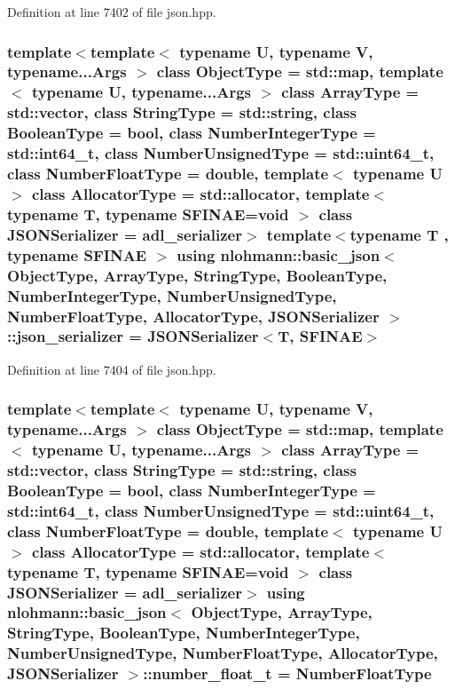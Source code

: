 Definition at line 7402 of file json.\+hpp.

\subsubsection[{\texorpdfstring{json\+\_\+serializer}{json_serializer}}]{\setlength{\rightskip}{0pt plus 5cm}template$<$template$<$ typename U, typename V, typename...\+Args $>$ class Object\+Type = std\+::map, template$<$ typename U, typename...\+Args $>$ class Array\+Type = std\+::vector, class String\+Type  = std\+::string, class Boolean\+Type  = bool, class Number\+Integer\+Type  = std\+::int64\+\_\+t, class Number\+Unsigned\+Type  = std\+::uint64\+\_\+t, class Number\+Float\+Type  = double, template$<$ typename U $>$ class Allocator\+Type = std\+::allocator, template$<$ typename T, typename S\+F\+I\+N\+A\+E=void $>$ class J\+S\+O\+N\+Serializer = adl\+\_\+serializer$>$ template$<$typename T , typename S\+F\+I\+N\+AE $>$ using {\bf nlohmann\+::basic\+\_\+json}$<$ Object\+Type, Array\+Type, String\+Type, Boolean\+Type, Number\+Integer\+Type, Number\+Unsigned\+Type, Number\+Float\+Type, Allocator\+Type, J\+S\+O\+N\+Serializer $>$\+::{\bf json\+\_\+serializer} =  J\+S\+O\+N\+Serializer$<$T, S\+F\+I\+N\+AE$>$}\hypertarget{classnlohmann_1_1basic__json_a7768841baaaa7a21098a401c932efaff}{}\label{classnlohmann_1_1basic__json_a7768841baaaa7a21098a401c932efaff}


Definition at line 7404 of file json.\+hpp.

\subsubsection[{\texorpdfstring{number\+\_\+float\+\_\+t}{number_float_t}}]{\setlength{\rightskip}{0pt plus 5cm}template$<$template$<$ typename U, typename V, typename...\+Args $>$ class Object\+Type = std\+::map, template$<$ typename U, typename...\+Args $>$ class Array\+Type = std\+::vector, class String\+Type  = std\+::string, class Boolean\+Type  = bool, class Number\+Integer\+Type  = std\+::int64\+\_\+t, class Number\+Unsigned\+Type  = std\+::uint64\+\_\+t, class Number\+Float\+Type  = double, template$<$ typename U $>$ class Allocator\+Type = std\+::allocator, template$<$ typename T, typename S\+F\+I\+N\+A\+E=void $>$ class J\+S\+O\+N\+Serializer = adl\+\_\+serializer$>$ using {\bf nlohmann\+::basic\+\_\+json}$<$ Object\+Type, Array\+Type, String\+Type, Boolean\+Type, Number\+Integer\+Type, Number\+Unsigned\+Type, Number\+Float\+Type, Allocator\+Type, J\+S\+O\+N\+Serializer $>$\+::{\bf number\+\_\+float\+\_\+t} =  Number\+Float\+Type}\hypertarget{classnlohmann_1_1basic__json_a88d6103cb3620410b35200ee8e313d97}{}\label{classnlohmann_1_1basic__json_a88d6103cb3620410b35200ee8e313d97}


